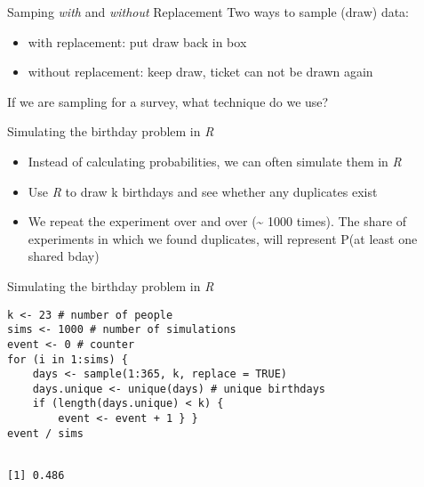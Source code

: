 \documentclass[presentation]{beamer}
\begin{document}
\begin{frame}[label={sec:org362dd7b}]{Samping \emph{with} and \emph{without} Replacement}
Two ways to sample (draw) data:

\begin{itemize}
\item with replacement: put draw back in box

\item without replacement: keep draw, ticket can \alert{not} be drawn again
\end{itemize}

\pause
If we are sampling for a survey, what technique do we use?
\end{frame}


\begin{frame}[label={sec:org4f0061e}]{Simulating the birthday problem in \emph{R}}
\begin{itemize}
\item Instead of calculating probabilities, we can often simulate them in \emph{R}

\item Use \emph{R} to draw k birthdays and see whether any duplicates exist
\end{itemize}

\pause

\begin{itemize}
\item We repeat the experiment over and over (\textasciitilde{} 1000 times). The share of experiments in which we found duplicates, will represent P(at least one shared bday)
\end{itemize}
\end{frame}

\begin{frame}[fragile,label={sec:orgbe38e16}]{Simulating the birthday problem in \emph{R}}
 \begin{verbatim}
k <- 23 # number of people
sims <- 1000 # number of simulations
event <- 0 # counter
for (i in 1:sims) {
    days <- sample(1:365, k, replace = TRUE)
    days.unique <- unique(days) # unique birthdays
    if (length(days.unique) < k) {
        event <- event + 1 } }
event / sims
\end{verbatim}

\begin{verbatim}

[1] 0.486
\end{verbatim}
\end{frame}
\end{document}
